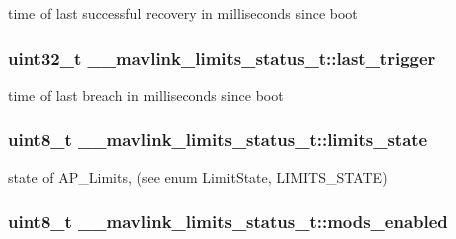 time of last successful recovery in milliseconds since boot 

\hypertarget{struct____mavlink__limits__status__t_a9941c756a21de46db70c07cc19247ed1}{
\subsubsection[{last\+\_\+trigger}]{\setlength{\rightskip}{0pt plus 5cm}uint32\+\_\+t \+\_\+\+\_\+mavlink\+\_\+limits\+\_\+status\+\_\+t\+::last\+\_\+trigger}}\label{struct____mavlink__limits__status__t_a9941c756a21de46db70c07cc19247ed1}


time of last breach in milliseconds since boot 

\hypertarget{struct____mavlink__limits__status__t_adbc320754ebc8df4d502d0ad209748bd}{
\subsubsection[{limits\+\_\+state}]{\setlength{\rightskip}{0pt plus 5cm}uint8\+\_\+t \+\_\+\+\_\+mavlink\+\_\+limits\+\_\+status\+\_\+t\+::limits\+\_\+state}}\label{struct____mavlink__limits__status__t_adbc320754ebc8df4d502d0ad209748bd}


state of A\+P\+\_\+\+Limits, (see enum Limit\+State, L\+I\+M\+I\+T\+S\+\_\+\+S\+T\+A\+T\+E) 

\hypertarget{struct____mavlink__limits__status__t_a1976338bf18897be8f5cf97898475079}{
\subsubsection[{mods\+\_\+enabled}]{\setlength{\rightskip}{0pt plus 5cm}uint8\+\_\+t \+\_\+\+\_\+mavlink\+\_\+limits\+\_\+status\+\_\+t\+::mods\+\_\+enabled}}\label{struct____mavlink__limits__status__t_a1976338bf18897be8f5cf97898475079}


